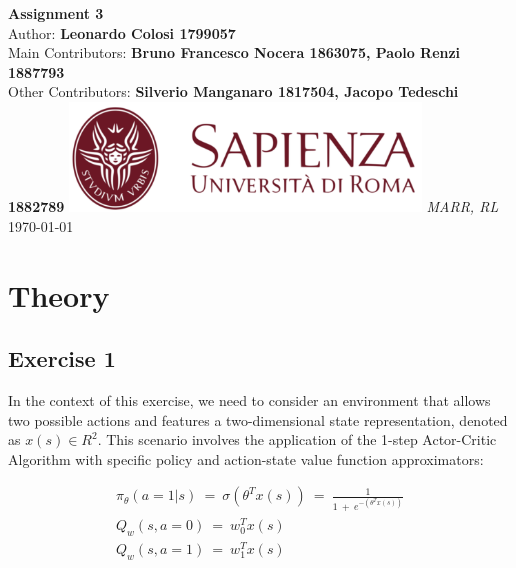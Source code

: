 \documentclass[10pt,a4paper]{article}
\begin{document}
\begin{titlepage}
    \begin{center}
        \vspace*{1cm}
        \Huge\textbf{Assignment 3}\\
        \vspace{1.5cm}
        \Large Author:
        \textbf{Leonardo Colosi 1799057}\\
        \vspace{0.5cm}
        \Large Main Contributors: \textbf{Bruno Francesco Nocera 1863075, Paolo Renzi 1887793} \\
        \vspace{0.3cm} 
        \Large Other Contributors: \textbf{Silverio Manganaro 1817504, Jacopo Tedeschi 1882789}
        \vfill
        \includegraphics[width=0.7\textwidth]{images/sapienza_logo.png}
        \vfill
        \vspace{0.8cm}
        \Large \textit{MARR, RL}\\
        \today
    \end{center}
\end{titlepage}
\newpage

\tableofcontents
\newpage

\section{Theory}
\subsection{Exercise 1}
In the context of this exercise, we need to consider an environment that allows two possible actions and features a two-dimensional state representation, denoted as $x(s)\in R^2$. This scenario involves the application of the 1-step Actor-Critic Algorithm with specific policy and action-state value function approximators:

\begin{gather*}
    \pi_{\theta}(a=1|s) \:=\: \sigma(\theta^{T} x(s)) \:=\: \frac{1}{1\:+\:e^{-(\theta^{T} x(s))}} \\
    Q_w (s,a=0) \:=\: w_{0}^{T}x(s) \\
    Q_w (s,a=1) \:=\: w_{1}^{T}x(s)
\end{gather*} 
\end{document}
